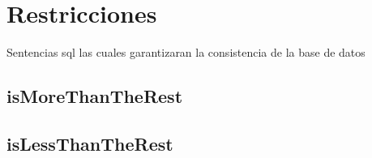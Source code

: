 \documentclass[a4paper,10pt]{article}
\begin{document}
\pagebreak

\section{Restricciones}
Sentencias sql las cuales garantizaran la consistencia de la base de datos
\subsection{isMoreThanTheRest}
\begin{scriptsize}
  
\end{scriptsize}
\pagebreak
\subsection{isLessThanTheRest}
\begin{scriptsize}
  
\end{scriptsize}
\end{document}
